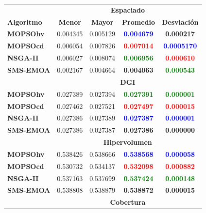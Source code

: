 \newpage
 \begin{table}
 \begin{center}
  \begin{tabular}{|l|cc|cc|} \hline
    & \multicolumn{4}{|c|}{\textbf{Espaciado}} \\ 
	\textbf{Algoritmo} & \textbf{Menor} & \textbf{Mayor} & \textbf{Promedio} & \textbf{Desviaci\'on} \\  \hline\hline
	\textbf{MOPSOhv} &0.004345 & 0.005129 & \textbf{\textcolor{blue}{0.004679}} & \textbf{0.000217}  \\ 
	\textbf{MOPSOcd} &0.006054 & 0.007826 & \textbf{\textcolor{red}{0.007014}} &  \textbf{\textcolor{blue}{0.0005170}}\\ 
	\textbf{NSGA-II} &0.006027 & 0.008074 & \textbf{\textcolor{green}{0.006956}} & \textbf{\textcolor{red}{ 0.000610}}  \\  
	\textbf{SMS-EMOA}&0.002167 & 0.004664 & \textbf{0.004063} & \textbf{\textcolor{green}{0.000543}}  \\  
	\hline\hline
    & \multicolumn{4}{|c|}{\textbf{DGI}} \\ \hline \hline	
	\textbf{MOPSOhv} &0.027389 & 0.027394 & \textbf{\textcolor{green}{0.027391}}& \textbf{\textcolor{green}{0.000001}}  \\ 
	\textbf{MOPSOcd} &0.027462 & 0.027521 & \textbf{\textcolor{red}{0.027497}}  & \textbf{\textcolor{red}{0.000015}}  \\ 
	\textbf{NSGA-II} &0.027386 & 0.027389 & \textbf{\textcolor{blue}{0.027387}} & \textbf{\textcolor{blue}{0.000001}}  \\  
	\textbf{SMS-EMOA}&0.027386 & 0.027387 & \textbf{0.027386} &\textbf{0.000000 } \\  
	\hline\hline
    & \multicolumn{4}{|c|}{\textbf{Hipervolumen}} \\ 	\hline \hline
	\textbf{MOPSOhv} &0.538426 & 0.538666 & \textbf{\textcolor{blue}{0.538568}} & \textbf{\textcolor{blue}{0.000058}} \\ 
	\textbf{MOPSOcd} &0.530732 & 0.534137 & \textbf{\textcolor{red}{0.532098}}  & \textbf{\textcolor{red}{0.000882}}   \\ 
	\textbf{NSGA-II} &0.537163 & 0.537699 & \textbf{\textcolor{green}{0.537424}}& \textbf{\textcolor{green}{0.000148}}  \\  
	\textbf{SMS-EMOA}&0.538808 & 0.538879 & \textbf{0.538872} & \textbf{0.000015}  \\  
	\hline\hline
    & \multicolumn{4}{|c|}{\textbf{Cobertura}} \\ \hline\hline 

\end{tabular}
\end{center}
\end{table}

